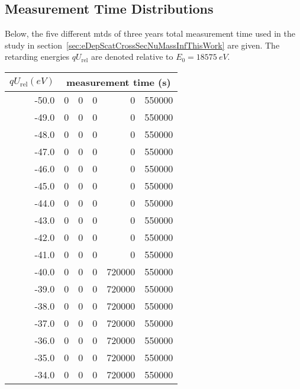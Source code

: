 \begin{samepage}
\section{Measurement Time Distributions}
\label{sec:appendixEDepScatCrossSecMTDs}
Below, the five different \gls{mtd}s of three years total measurement time used in the study in section~\ref{sec:eDepScatCrossSecNuMassInfThisWork} are given. The retarding energies $qU_\mathrm{rel}$ are denoted relative to $E_0=\SI{18575}{eV}$.\\[10pt]
\begin{center}
{\scriptsize
\centering
\begin{tabular}{rrrrrr}
	\toprule
	$qU_\mathrm{rel} (eV)$ & \multicolumn{5}{c}{measurement time (s)} \\
	\hline
	-50.0 &        0 &        0 &        0 &        0 &   550000 \\
	-49.0 &        0 &        0 &        0 &        0 &   550000 \\
	-48.0 &        0 &        0 &        0 &        0 &   550000 \\
	-47.0 &        0 &        0 &        0 &        0 &   550000 \\
	-46.0 &        0 &        0 &        0 &        0 &   550000 \\
	-45.0 &        0 &        0 &        0 &        0 &   550000 \\
	-44.0 &        0 &        0 &        0 &        0 &   550000 \\
	-43.0 &        0 &        0 &        0 &        0 &   550000 \\
	-42.0 &        0 &        0 &        0 &        0 &   550000 \\
	-41.0 &        0 &        0 &        0 &        0 &   550000 \\
	-40.0 &        0 &        0 &        0 &   720000 &   550000 \\
	-39.0 &        0 &        0 &        0 &   720000 &   550000 \\
	-38.0 &        0 &        0 &        0 &   720000 &   550000 \\
	-37.0 &        0 &        0 &        0 &   720000 &   550000 \\
	-36.0 &        0 &        0 &        0 &   720000 &   550000 \\
	-35.0 &        0 &        0 &        0 &   720000 &   550000 \\
	-34.0 &        0 &        0 &        0 &   720000 &   550000 \\

\end{tabular}}
\end{center}
\end{samepage}
